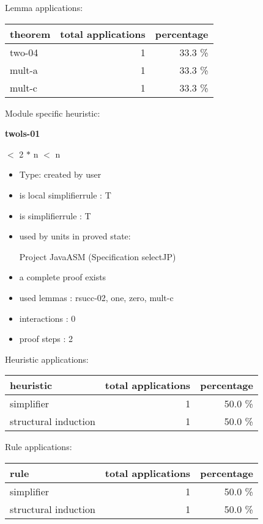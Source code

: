 \documentclass[a4paper]{article}
\begin{document}
Lemma applications:

\begin{supertabular}{l|r|r}
theorem	        & total applications & percentage \\ \hline
two-04 & 1 & 33.3 \% \\
mult-a & 1 & 33.3 \% \\
mult-c & 1 & 33.3 \% \\

\end{supertabular}

Module specific heuristic:

\pagebreak

{\LARGE\bf twols-01}\label{lemma-twols-01}

\medskip

  $<$ 2 $*$ n  $<$ n

\begin{itemize}

\item Type: created by user

\item is local simplifierrule : T
\item is simplifierrule : T
\item used by units in proved state:

Project JavaASM (Specification selectJP)
\item       a complete proof exists
\item       used lemmas  : rsucc-02, one, zero, mult-c
\item       interactions : 0
\item       proof steps  : 2
\end{itemize}

\medskip


Heuristic applications:

\begin{supertabular}{l|r|r}
heuristic	& total applications & percentage \\ \hline
simplifier & 1 & 50.0 \% \\
structural induction & 1 & 50.0 \% \\

\end{supertabular}

Rule applications:

\begin{supertabular}{l|r|r}
rule	        & total applications & percentage \\ \hline
simplifier & 1 & 50.0 \% \\
structural induction & 1 & 50.0 \% \\

\end{supertabular}
\end{document}
